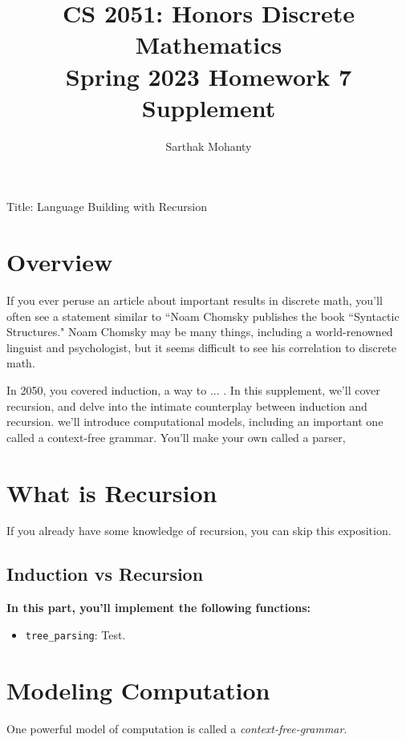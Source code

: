 \documentclass{article}
\title{\vspace{-1cm}CS 2051: Honors Discrete Mathematics \\Spring 2023 Homework 7 Supplement}
\author{Sarthak Mohanty }
\date{}
\begin{document}
\maketitle


Title: Language Building with Recursion

\section*{Overview}

If you ever peruse an article about important results in discrete math, you'll often see a statement similar to ``Noam Chomsky publishes the book “Syntactic Structures."  Noam Chomsky may be many things, including a world-renowned linguist and psychologist, but it seems difficult to see his correlation to discrete math.

In 2050, you covered induction, a way to ... . In this supplement, we'll cover recursion, and delve into the intimate counterplay between induction and recursion. we'll introduce computational models, including an important one called a context-free grammar. You'll make your own called a parser,

\section*{What is Recursion}

If you already have some knowledge of recursion, you can skip this exposition.
\subsection*{Induction vs Recursion}


\begin{tcolorbox}[enhanced,interior style={top color=Dandelion!20,bottom color=Dandelion!30}]
    \textbf{In this part, you'll implement the following functions:}
    \begin{itemize}
        \item \lstinline{tree_parsing}: Test.
    \end{itemize}
\end{tcolorbox}


\section*{Modeling Computation}
    One powerful model of computation is called a \textit{context-free-grammar}. 
\end{document}
